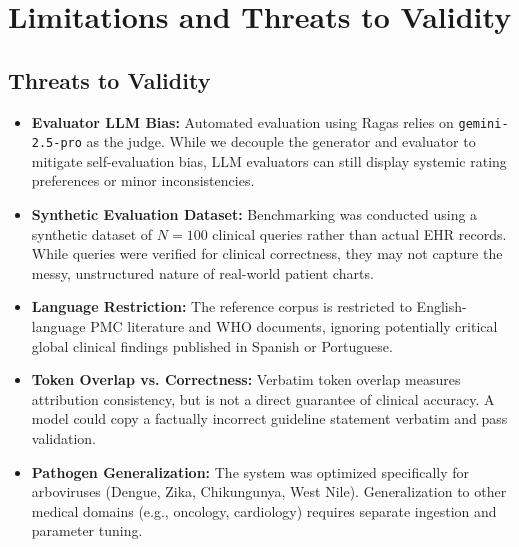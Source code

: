 \section{Limitations and Threats to Validity}\label{sec:limitations}

\subsection{Threats to Validity}
\begin{itemize}
    \item \textbf{Evaluator LLM Bias:} Automated evaluation using Ragas relies on \texttt{gemini-2.5-pro} as the judge. While we decouple the generator and evaluator to mitigate self-evaluation bias, LLM evaluators can still display systemic rating preferences or minor inconsistencies.
    \item \textbf{Synthetic Evaluation Dataset:} Benchmarking was conducted using a synthetic dataset of $N=100$ clinical queries rather than actual EHR records. While queries were verified for clinical correctness, they may not capture the messy, unstructured nature of real-world patient charts.
    \item \textbf{Language Restriction:} The reference corpus is restricted to English-language PMC literature and WHO documents, ignoring potentially critical global clinical findings published in Spanish or Portuguese.
    \item \textbf{Token Overlap vs. Correctness:} Verbatim token overlap measures attribution consistency, but is not a direct guarantee of clinical accuracy. A model could copy a factually incorrect guideline statement verbatim and pass validation.
    \item \textbf{Pathogen Generalization:} The system was optimized specifically for arboviruses (Dengue, Zika, Chikungunya, West Nile). Generalization to other medical domains (e.g., oncology, cardiology) requires separate ingestion and parameter tuning.
\end{itemize}

